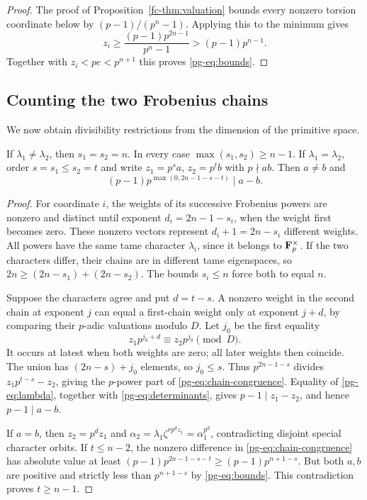 \begin{proof}
The proof of Proposition~\ref{fc-thm:valuation} bounds every nonzero torsion coordinate below by $(p-1)/(p^n-1)$. Applying this to the minimum gives
\[
 z_i\ge\frac{(p-1)p^{2n-1}}{p^n-1}>(p-1)p^{n-1}.
\]
Together with $z_i<pe<p^{n+1}$ this proves \eqref{pg-eq:bounds}.
\end{proof}

\subsection{Counting the two Frobenius chains}
We now obtain divisibility restrictions from the dimension of the primitive space.

\begin{proposition}\label{pg-prop:chains}
If $\lambda_1\ne\lambda_2$, then $s_1=s_2=n$. In every case $\max(s_1,s_2)\ge n-1$. If $\lambda_1=\lambda_2$, order $s=s_1\le s_2=t$ and write $z_1=p^s a$, $z_2=p^t b$ with $p\nmid ab$. Then $a\ne b$ and
\begin{equation}\label{pg-eq:chain-congruence}
 (p-1)p^{\max(0,2n-1-s-t)}\mid a-b.
\end{equation}
\end{proposition}
\begin{proof}
For coordinate $i$, the weights of its successive Frobenius powers are nonzero and distinct until exponent $d_i=2n-1-s_i$, when the weight first becomes zero. These nonzero vectors represent $d_i+1=2n-s_i$ different weights. All powers have the same tame character $\lambda_i$, since it belongs to $\mathbf F_p^\times$. If the two characters differ, their chains are in different tame eigenspaces, so $2n\ge(2n-s_1)+(2n-s_2)$. The bounds $s_i\le n$ force both to equal $n$.

Suppose the characters agree and put $d=t-s$. A nonzero weight in the second chain at exponent $j$ can equal a first-chain weight only at exponent $j+d$, by comparing their $p$-adic valuations modulo $D$. Let $j_0$ be the first equality
\[
 z_1p^{j_0+d}\equiv z_2p^{j_0}\pmod D.
\]
It occurs at latest when both weights are zero; all later weights then coincide. The union has $(2n-s)+j_0$ elements, so $j_0\le s$. Thus $p^{2n-1-s}$ divides $z_1p^{t-s}-z_2$, giving the $p$-power part of \eqref{pg-eq:chain-congruence}. Equality of \eqref{pg-eq:lambda}, together with \eqref{pg-eq:determinants}, gives $p-1\mid z_1-z_2$, and hence $p-1\mid a-b$.

If $a=b$, then $z_2=p^d z_1$ and $\alpha_2=\lambda_1\zeta^{rp^dz_1}=\alpha_1^{p^d}$, contradicting disjoint special character orbits. If $t\le n-2$, the nonzero difference in \eqref{pg-eq:chain-congruence} has absolute value at least $(p-1)p^{2n-1-s-t}\ge(p-1)p^{n+1-s}$. But both $a,b$ are positive and strictly less than $p^{n+1-s}$ by \eqref{pg-eq:bounds}. This contradiction proves $t\ge n-1$.
\end{proof}

